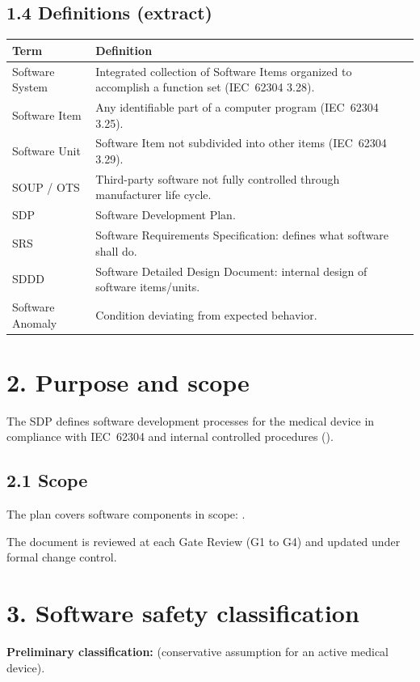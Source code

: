 \subsection*{1.4 Definitions (extract)}
\begin{longtable}{|p{3cm}|p{10.4cm}|}
\hline
\textbf{Term} & \textbf{Definition} \\
\hline
Software System & Integrated collection of Software Items organized to accomplish a function set (IEC~62304 3.28). \\
\hline
Software Item & Any identifiable part of a computer program (IEC~62304 3.25). \\
\hline
Software Unit & Software Item not subdivided into other items (IEC~62304 3.29). \\
\hline
SOUP / OTS & Third-party software not fully controlled through manufacturer life cycle. \\
\hline
SDP & Software Development Plan. \\
\hline
SRS & Software Requirements Specification: defines what software shall do. \\
\hline
SDDD & Software Detailed Design Document: internal design of software items/units. \\
\hline
Software Anomaly & Condition deviating from expected behavior. \\
\hline
\end{longtable}

\section*{2. Purpose and scope}

The SDP defines software development processes for the medical device in compliance with IEC~62304 and internal controlled procedures (\caviarder[2.8cm]).

\subsection*{2.1 Scope}
The plan covers software components in scope: \caviarder[5.5cm].

The document is reviewed at each Gate Review (G1 to G4) and updated under formal change control.

\section*{3. Software safety classification}

\textbf{Preliminary classification:} \caviarder[2.2cm] (conservative assumption for an active medical device).

